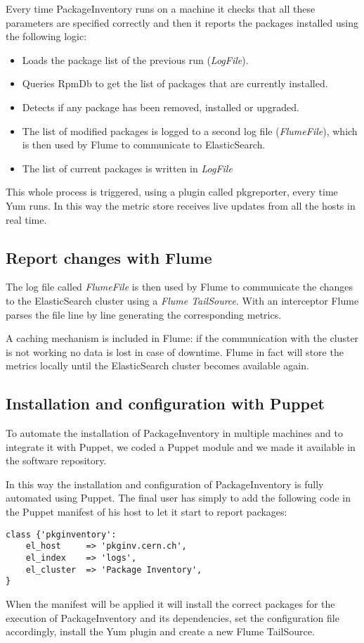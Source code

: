 Every time PackageInventory runs on a machine it checks that all these
parameters are specified correctly and then it reports the packages
installed using the following logic:

\begin{itemize}
    \item Loads the package list of the previous run (\textit{LogFile}).
    \item Queries RpmDb to get the list of packages that are currently
            installed.
    \item Detects if any package has been removed, installed or upgraded.
    \item The list of modified packages is logged to a second log file
            (\textit{FlumeFile}), which is then used by Flume to communicate
            to ElasticSearch.
    \item The list of current packages is written in \textit{LogFile}
\end{itemize}

This whole process is triggered, using a plugin called pkgreporter, every
time Yum runs. In this way the metric store receives live updates from all
the hosts in real time. 

\subsection{Report changes with Flume}

The log file called \textit{FlumeFile} is then used by Flume to
communicate the changes to the ElasticSearch cluster using a \textit{Flume
TailSource}. With an interceptor Flume parses the file line by line
generating the corresponding metrics.

A caching mechanism is included in Flume: if the communication with the
cluster is not working no data is lost in case of downtime. Flume in fact
will store the metrics locally until the ElasticSearch cluster becomes
available again.

\subsection{Installation and configuration with Puppet}

To automate the installation of PackageInventory in multiple machines and
to integrate it with Puppet, we coded a Puppet module and we made it
available in the software repository.

In this way the installation and configuration of PackageInventory is
fully automated using Puppet. The final user has simply to add the
following code in the Puppet manifest of his host to let it start to
report packages:

\begin{lstlisting}[frame=single]
class {'pkginventory':
    el_host     => 'pkginv.cern.ch',
    el_index    => 'logs',
    el_cluster  => 'Package Inventory',
}
\end{lstlisting}

When the manifest will be applied it will install the correct packages for
the execution of PackageInventory and its dependencies, set the
configuration file accordingly, install the Yum plugin and create a new
Flume TailSource.
